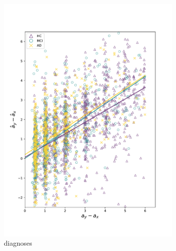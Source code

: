 \begin{figure}[h]
	\centering
	\begin{subfigure}{0.48\textwidth}
		\includegraphics[width=\linewidth, trim={18 30 30 30}, clip]{images/age_plots/d_dhat_real} 
		\vspace{-20pt}
		\caption{diagnoses}
	\end{subfigure}
	\begin{subfigure}{0.48\textwidth}

\end{subfigure}
\end{figure}
